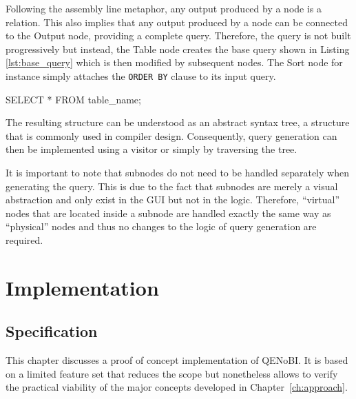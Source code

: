 \documentclass[11pt,a4paper]{globis-book}
\begin{document}
Following the assembly line metaphor, any output produced by a node is a relation. This also implies that any output produced by a node can be connected to the Output node, providing a complete query. Therefore, the query is not built progressively but instead, the Table node creates the base query shown in Listing \ref{lst:base_query} which is then modified by subsequent nodes. The Sort node for instance simply attaches the \texttt{ORDER BY} clause to its input query.

\begin{codeex}[caption=Base query generated by the Table node, label=lst:base_query]
SELECT *
FROM table_name;
\end{codeex}

The resulting structure can be understood as an abstract syntax tree, a structure that is commonly used in compiler design. Consequently, query generation can then be implemented using a visitor or simply by traversing the tree.

It is important to note that subnodes do not need to be handled separately when generating the query. This is due to the fact that subnodes are merely a visual abstraction and only exist in the GUI but not in the logic. Therefore, ``virtual'' nodes that are located inside a subnode are handled exactly the same way as ``physical'' nodes and thus no changes to the logic of query generation are required.


\chapter{Implementation}
\label{ch:impl}

\section{Specification}
This chapter discusses a proof of concept implementation of QENoBI. It is based on a limited feature set that reduces the scope but nonetheless allows to verify the practical viability of the major concepts developed in Chapter~\ref{ch:approach}.
\end{document}
